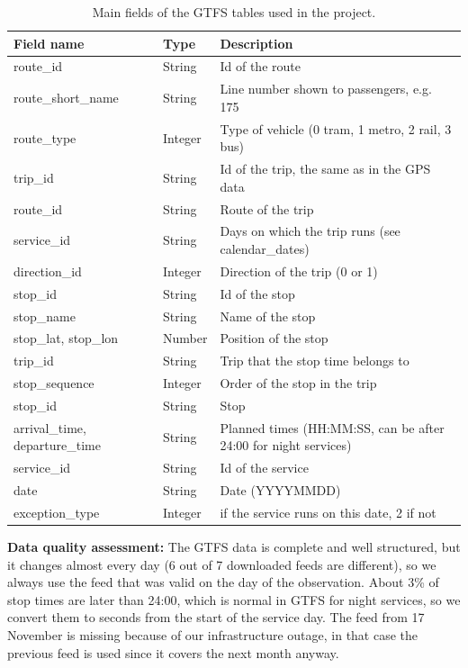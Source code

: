\documentclass[11pt]{article}
\begin{document}
\begin{table}[H]
\centering
\caption{Main fields of the GTFS tables used in the project.}\label{tab:fields-gtfs}
\begin{tabular}{|>{\raggedright\arraybackslash}p{3.6cm}|>{\raggedright\arraybackslash}p{2cm}|>{\raggedright\arraybackslash}p{8cm}|}
\hline
\textbf{Field name} & \textbf{Type} & \textbf{Description} \\
\hline
route\_id & String & Id of the route \\ \hline
route\_short\_name & String & Line number shown to passengers, e.g. 175 \\ \hline
route\_type & Integer & Type of vehicle (0 tram, 1 metro, 2 rail, 3 bus) \\ \hline
trip\_id & String & Id of the trip, the same as in the GPS data \\ \hline
route\_id & String & Route of the trip \\ \hline
service\_id & String & Days on which the trip runs (see calendar\_dates) \\ \hline
direction\_id & Integer & Direction of the trip (0 or 1) \\ \hline
stop\_id & String & Id of the stop \\ \hline
stop\_name & String & Name of the stop \\ \hline
stop\_lat, stop\_lon & Number & Position of the stop \\ \hline
trip\_id & String & Trip that the stop time belongs to \\ \hline
stop\_sequence & Integer & Order of the stop in the trip \\ \hline
stop\_id & String & Stop \\ \hline
arrival\_time, departure\_time & String & Planned times (HH:MM:SS, can be after 24:00 for night services) \\ \hline
service\_id & String & Id of the service \\ \hline
date & String & Date (YYYYMMDD) \\ \hline
exception\_type & Integer & 1 if the service runs on this date, 2 if not \\ \hline
\end{tabular}
\end{table}

\noindent\textbf{Data quality assessment:}
The GTFS data is complete and well structured, but it changes almost every day (6 out of 7 downloaded feeds are different),
so we always use the feed that was valid on the day of the observation. 
About 3\% of stop times are later than 24:00, which is normal in GTFS for night services, so we convert them to seconds from the start of the service day.
The feed from 17 November is missing because of our infrastructure outage, in that case the previous feed is used since it covers the next month anyway.
\end{document}
